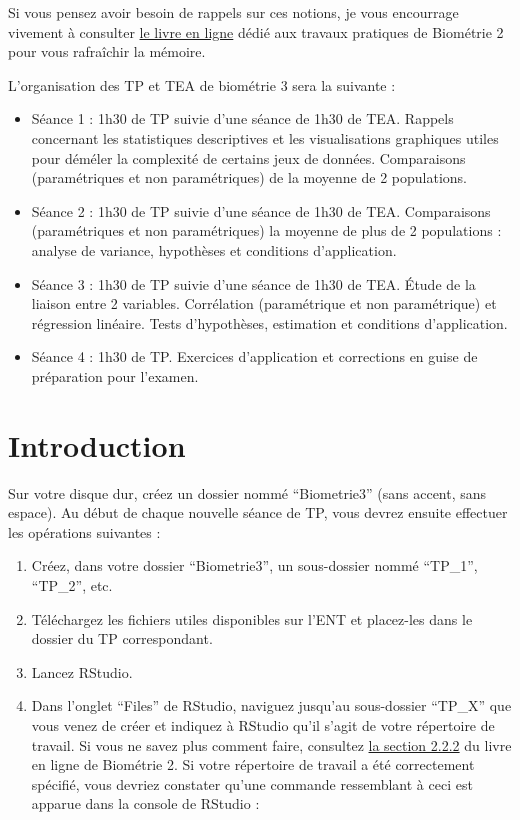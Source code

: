 \documentclass[a4paperpaper,]{article}
\providecommand{\tightlist}{%
  \setlength{\itemsep}{0pt}\setlength{\parskip}{0pt}}
\begin{document}
Si vous pensez avoir besoin de rappels sur ces notions, je vous encourrage vivement à consulter \href{https://besibo.github.io/Biometrie2/}{le livre en ligne} dédié aux travaux pratiques de Biométrie 2 pour vous rafraîchir la mémoire.

L'organisation des TP et TEA de biométrie 3 sera la suivante :

\begin{itemize}
\tightlist
\item
  Séance 1 : 1h30 de TP suivie d'une séance de 1h30 de TEA. Rappels concernant les statistiques descriptives et les visualisations graphiques utiles pour déméler la complexité de certains jeux de données. Comparaisons (paramétriques et non paramétriques) de la moyenne de 2 populations.
\item
  Séance 2 : 1h30 de TP suivie d'une séance de 1h30 de TEA. Comparaisons (paramétriques et non paramétriques) la moyenne de plus de 2 populations : analyse de variance, hypothèses et conditions d'application.
\item
  Séance 3 : 1h30 de TP suivie d'une séance de 1h30 de TEA. Étude de la liaison entre 2 variables. Corrélation (paramétrique et non paramétrique) et régression linéaire. Tests d'hypothèses, estimation et conditions d'application.
\item
  Séance 4 : 1h30 de TP. Exercices d'application et corrections en guise de préparation pour l'examen.
\end{itemize}

\hypertarget{intro}{%
\section{Introduction}\label{intro}}

Sur votre disque dur, créez un dossier nommé ``Biometrie3'' (sans accent, sans espace).
Au début de chaque nouvelle séance de TP, vous devrez ensuite effectuer les opérations suivantes :

\begin{enumerate}
\def\labelenumi{\arabic{enumi}.}
\tightlist
\item
  Créez, dans votre dossier ``Biometrie3'', un sous-dossier nommé ``TP\_1'', ``TP\_2'', etc.
\item
  Téléchargez les fichiers utiles disponibles sur l'ENT et placez-les dans le dossier du TP correspondant.
\item
  Lancez RStudio.
\item
  Dans l'onglet ``Files'' de RStudio, naviguez jusqu'au sous-dossier ``TP\_X'' que vous venez de créer et indiquez à RStudio qu'il s'agit de votre répertoire de travail. Si vous ne savez plus comment faire, consultez \href{https://besibo.github.io/Biometrie2/bases.html\#le-repertoire-de-travail}{la section 2.2.2} du livre en ligne de Biométrie 2. Si votre répertoire de travail a été correctement spécifié, vous devriez constater qu'une commande ressemblant à ceci est apparue dans la console de RStudio :
\end{enumerate}
\end{document}
